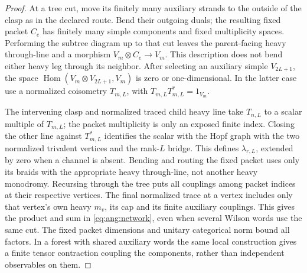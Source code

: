 \begin{proof}
At a tree cut, move its finitely many auxiliary strands to the outside of the clasp as in the declared route. Bend their outgoing duals; the resulting fixed packet \(C_e\) has finitely many simple components and fixed multiplicity spaces. Performing the subtree diagram up to that cut leaves the parent-facing heavy through-line and a morphism \(V_m\otimes C_e\to V_m\). This description does not bend either heavy leg through its neighbor. After selecting an auxiliary simple \(V_{2L+1}\), the space \(\operatorname{Hom}(V_m\otimes V_{2L+1},V_m)\) is zero or one-dimensional. In the latter case use a normalized coisometry \(T_{m,L}\), with \(T_{m,L}T_{m,L}^*=1_{V_m}\).

The intervening clasp and normalized traced child heavy line take \(T_{n,L}\) to a scalar multiple of \(T_{m,L}\); the packet multiplicity is only an exposed finite index. Closing the other line against \(T_{m,L}^*\) identifies the scalar with the Hopf graph with the two normalized trivalent vertices and the rank-\(L\) bridge. This defines \(\lambda_{r,L}\), extended by zero when a channel is absent. Bending and routing the fixed packet uses only its braids with the appropriate heavy through-line, not another heavy monodromy. Recursing through the tree puts all couplings among packet indices at their respective vertices. The final normalized trace at a vertex includes only that vertex's own heavy \(m_v\), its cap and its finite auxiliary couplings. This gives the product and sum in \eqref{eq:ang:network}, even when several Wilson words use the same cut. The fixed packet dimensions and unitary categorical norm bound all factors. In a forest with shared auxiliary words the same local construction gives a finite tensor contraction coupling the components, rather than independent observables on them.
\end{proof}

